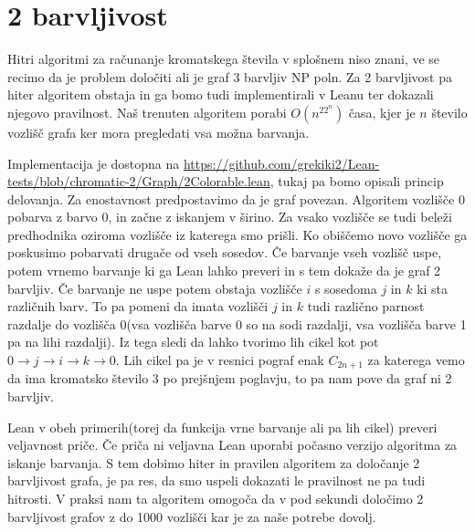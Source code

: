 \documentclass[mat1]{fmfdelo}
\begin{document}
\section{2 barvljivost}
Hitri algoritmi za računanje kromatskega števila v splošnem niso znani, 
ve se recimo da je problem določiti ali je graf 3 barvljiv NP poln.
Za 2 barvljivost pa hiter algoritem obstaja in ga bomo tudi implementirali v Leanu ter dokazali njegovo pravilnost. 
Naš trenuten algoritem porabi $O(n^22^n)$ časa, kjer je $n$ število vozlišč grafa ker mora pregledati vsa možna barvanja.

Implementacija je dostopna na \url{https://github.com/grekiki2/Lean-tests/blob/chromatic-2/Graph/2Colorable.lean}, tukaj pa
bomo opisali princip delovanja. 
Za enostavnost predpostavimo da je graf povezan.
Algoritem vozlišče $0$ pobarva z barvo $0$, in začne z iskanjem v širino. Za vsako vozlišče se tudi beleži
predhodnika oziroma vozlišče iz katerega smo prišli. Ko obiščemo novo vozlišče ga poskusimo pobarvati drugače od vseh sosedov.
Če barvanje vseh vozlišč uspe, potem vrnemo barvanje ki ga Lean lahko preveri in s tem dokaže da je graf 2 barvljiv.
Če barvanje ne uspe potem obstaja vozlišče $i$ s sosedoma $j$ in $k$ ki sta različnih barv. To pa pomeni da imata vozlišči $j$ in $k$
tudi različno parnost razdalje do vozlišča $0$(vsa vozlišča barve 0 so na sodi razdalji, vsa vozlišča barve 1 pa na lihi razdalji).
Iz tega sledi da lahko tvorimo lih cikel kot pot $0\to j\to i\to k\to 0$. Lih cikel pa je v resnici pograf enak $C_{2n+1}$ za katerega
vemo da ima kromatsko število $3$ po prejšnjem poglavju, to pa nam pove da graf ni 2 barvljiv.

Lean v obeh primerih(torej da funkcija vrne barvanje ali pa lih cikel) preveri veljavnost priče. Če priča ni veljavna
Lean uporabi počasno verzijo algoritma za iskanje barvanja. 
S tem dobimo hiter in pravilen algoritem za določanje 2 barvljivost grafa, je pa res, da smo uspeli dokazati le pravilnost
ne pa tudi hitrosti. V praksi nam ta algoritem omogoča da v pod sekundi določimo 2 barvljivost grafov z do 1000 vozlišči
kar je za naše potrebe dovolj.
\end{document}
